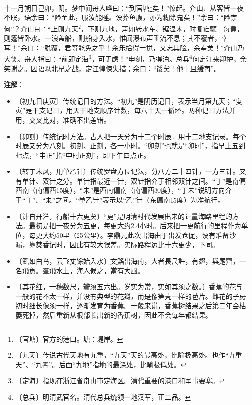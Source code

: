\documentclass[12pt,UTF-8,openany]{ctexbook}
\begin{document}
\begin{normalsize}
    十一月朔日己卯，阴。梦中闻舟人哗曰：“到官塘\footnote{〔官塘〕官方的港口。塘：堤岸。}矣！”惊起。介山、从客皆一夜不眠，语余曰：“险至此，服汝能睡。设葬鱼腹，亦为糊涂鬼矣！”余曰：“险奈何”？介山曰：“上则九天\footnote{〔九天〕传说古代天地有九重，“九天”天的最高处，比喻极高处。也作“九重天”、“九霄”。后面“九地”指地的最深处，比喻极低处。}，下则九地，声如转水车、锯湿木，时复疟颤；每侧，则篷皆卧水。一浪盖船，则船身入水，惟闻瀑布声垂流不息；其不覆者，幸耳！”余曰：“脱覆，君等能免之乎！余乐拾得一觉，又忘其险，余幸矣！”介山乃大笑。舟人指曰：“前即定海\footnote{〔定海〕指现在浙江省舟山市定海区。清代重要的港口和军事要塞。}，可无虑！”申刻，乃得泊。总兵\footnote{〔总兵〕明清武官名。清代总兵统领一地汉军，正二品。}何定江来迎护，余笑谢之。因语以北杞之战，定江惶悚失措；余曰：“馁矣！他事且缓商”。
\end{normalsize}


\newpage

\textbf{注解}：

\vspace{-1em}

\begin{itemize}
    \setlength\itemsep{-0.2em}
    \item〔初九日庚寅〕传统记日的方法。“初九”是阴历记日，表示当月第九天；“庚寅”是干支记日，用天干地支顺序计数，每六十天一循环。两种记日方法并用，交叉比对，准确不出差错。
    \item〔卯刻〕传统记时方法。古人把一天分为十二个时辰，用十二地支记录。每个时辰又分为八刻。初刻、正刻，各一小时。“卯刻”也就是“卯时”，指早上五到七点，“申正”指“申时正刻”，即下午四点正。
    \item〔转丁未风，用单乙针〕传统罗盘方位记法，分八方二十四针，一方三针。又有单针、双针之分。单针指最近一针，双针指介于相邻双针之间。“丁”是南偏西南（南偏西15度），“未”是西南偏南（南偏西30度），“丁未”说明方向介于“丁”、“未”之间。“单乙针”表示以“乙”针（东偏南15度）为准航行。
    \item〔计自开洋，行船十六更矣〕“更”是明清时代发展出来的计量海路里程的方法。最初是把一夜分为五更，每更大约2.4小时。后来把一更航行的里程作为单位，每更大约50里（25公里）。李鼎元此次出海由于出发仓促，没有准备沙漏，靠焚香记时，因此有较大误差。实际路程远比十六更少，下同。
    \item〔鳐如白鸟，云飞丈馀始入水〕文鰩出海南，大者長尺許，有翅，與尾齊，一名飛魚。羣飛水上，海人候之，當有大風。
    \item〔其花红，一穗数尺，瓣须五六出。岁实为常，实如其须之数。〕香蕉的花与一般的花不太一样，并没有典型的花瓣，而是像笋壳一样的苞片。雌花的子房初时细长像须一样，逐渐发育为香蕉。一般来说，香蕉树结果之后第二年会枯萎死掉，然后重新从根部长出新的香蕉树，因此不会每年都结果。
\end{itemize}
\end{document}
